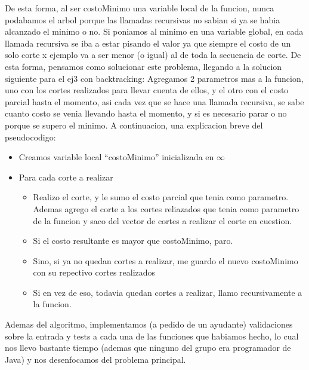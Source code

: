 \documentclass[12pt, a4paper,english,spanish]{article}
\begin{document}
\vspace{0.5cm}

De esta forma, al ser costoMinimo una variable local de la funcion, nunca podabamos el arbol porque las llamadas recursivas no sabian si ya se habia alcanzado el minimo o no. Si poniamos al minimo en una variable global, en cada llamada recursiva se iba a estar pisando el valor ya que siempre el costo de un solo corte x ejemplo va a ser menor (o igual) al de toda la secuencia de corte. De esta forma, pensamos como solucionar este problema, llegando a la solucion siguiente para el ej3 con backtracking: Agregamos 2 parametros mas a la funcion, uno con los cortes realizados para llevar cuenta de ellos, y el otro con el costo parcial hasta el momento, asi cada vez que se hace una llamada recursiva, se sabe cuanto costo se venia llevando hasta el momento, y si es necesario parar o no porque se supero el minimo. A continuacion, una explicacion breve del pseudocodigo:

\vspace{0.5cm}

\begin{itemize}
\item Creamos variable local ``costoMinimo'' inicializada en $\infty$
\item Para cada corte a realizar
\begin{itemize}
\item Realizo el corte, y le sumo el costo parcial que tenia como parametro. Ademas agrego el corte a los cortes reliazados que tenia como parametro de la funcion y saco del vector de cortes a realizar el corte en cuestion.
\item Si el costo resultante es mayor que costoMinimo, paro.
\item Sino, si ya no quedan cortes a realizar, me guardo el nuevo costoMinimo con su repectivo cortes realizados
\item Si en vez de eso, todavia quedan cortes a realizar, llamo recursivamente a la funcion.
\end{itemize}
\end{itemize}

Ademas del algoritmo, implementamos (a pedido de un ayudante) validaciones sobre la entrada y tests a cada una de las funciones que habiamos hecho, lo cual nos llevo bastante tiempo (ademas que ninguno del grupo era programador de Java) y nos desenfocamos del problema principal.

\vspace{0.5cm}
\end{document}
